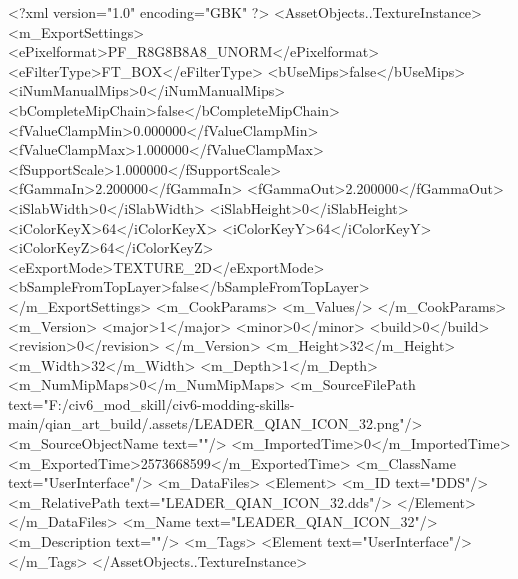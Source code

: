 <?xml version="1.0" encoding="GBK" ?>
<AssetObjects..TextureInstance>
	<m_ExportSettings>
		<ePixelformat>PF_R8G8B8A8_UNORM</ePixelformat>
		<eFilterType>FT_BOX</eFilterType>
		<bUseMips>false</bUseMips>
		<iNumManualMips>0</iNumManualMips>
		<bCompleteMipChain>false</bCompleteMipChain>
		<fValueClampMin>0.000000</fValueClampMin>
		<fValueClampMax>1.000000</fValueClampMax>
		<fSupportScale>1.000000</fSupportScale>
		<fGammaIn>2.200000</fGammaIn>
		<fGammaOut>2.200000</fGammaOut>
		<iSlabWidth>0</iSlabWidth>
		<iSlabHeight>0</iSlabHeight>
		<iColorKeyX>64</iColorKeyX>
		<iColorKeyY>64</iColorKeyY>
		<iColorKeyZ>64</iColorKeyZ>
		<eExportMode>TEXTURE_2D</eExportMode>
		<bSampleFromTopLayer>false</bSampleFromTopLayer>
	</m_ExportSettings>
	<m_CookParams>
		<m_Values/>
	</m_CookParams>
	<m_Version>
		<major>1</major>
		<minor>0</minor>
		<build>0</build>
		<revision>0</revision>
	</m_Version>
	<m_Height>32</m_Height>
	<m_Width>32</m_Width>
	<m_Depth>1</m_Depth>
	<m_NumMipMaps>0</m_NumMipMaps>
	<m_SourceFilePath text="F:/civ6_mod_skill/civ6-modding-skills-main/qian_art_build/.assets/LEADER_QIAN_ICON_32.png"/>
	<m_SourceObjectName text=""/>
	<m_ImportedTime>0</m_ImportedTime>
	<m_ExportedTime>2573668599</m_ExportedTime>
	<m_ClassName text="UserInterface"/>
	<m_DataFiles>
		<Element>
			<m_ID text="DDS"/>
			<m_RelativePath text="LEADER_QIAN_ICON_32.dds"/>
		</Element>
	</m_DataFiles>
	<m_Name text="LEADER_QIAN_ICON_32"/>
	<m_Description text=""/>
	<m_Tags>
		<Element text="UserInterface"/>
	</m_Tags>
</AssetObjects..TextureInstance>
